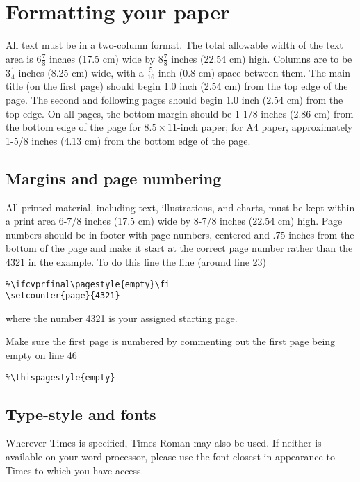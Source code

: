 \documentclass[12pt,letterpaper]{article}
\begin{document}
\section{Formatting your paper}

All text must be in a two-column format. The total allowable width of the
text area is $6\frac78$ inches (17.5 cm) wide by $8\frac78$ inches (22.54
cm) high. Columns are to be $3\frac14$ inches (8.25 cm) wide, with a
$\frac{5}{16}$ inch (0.8 cm) space between them. The main title (on the
first page) should begin 1.0 inch (2.54 cm) from the top edge of the
page. The second and following pages should begin 1.0 inch (2.54 cm) from
the top edge. On all pages, the bottom margin should be 1-1/8 inches (2.86
cm) from the bottom edge of the page for $8.5 \times 11$-inch paper; for A4
paper, approximately 1-5/8 inches (4.13 cm) from the bottom edge of the
page.

\subsection{Margins and page numbering}

All printed material, including text, illustrations, and charts, must be kept
within a print area 6-7/8 inches (17.5 cm) wide by 8-7/8 inches (22.54 cm)
high.
Page numbers should be in footer with page numbers, centered and .75
inches from the bottom of the page and make it start at the correct page
number rather than the 4321 in the example.  To do this fine the line (around
line 23)
\begin{verbatim}
%\ifcvprfinal\pagestyle{empty}\fi
\setcounter{page}{4321}
\end{verbatim}
where the number 4321 is your assigned starting page.

Make sure the first page is numbered by commenting out the first page being
empty on line 46
\begin{verbatim}
%\thispagestyle{empty}
\end{verbatim}


\subsection{Type-style and fonts}

Wherever Times is specified, Times Roman may also be used. If neither is
available on your word processor, please use the font closest in
appearance to Times to which you have access.
\end{document}
